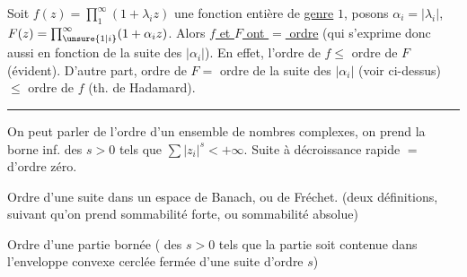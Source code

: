 Soit $f(z)=\prod_1^\infty(1+\lambda_iz)$ une fonction entière
de \uline{genre} $1$, posons $\alpha_i=|\lambda_i|$, $F(z)=\prod_{\unsure{1|i}}^\infty(1+\alpha_i z)$.
Alors \uline{$f$ et $F$ ont $=$ ordre} (qui s'exprime donc
aussi en fonction de la suite des $|\alpha_i|$). En effet,
l'ordre de $f\leq$ ordre de $F$ (évident). D'autre
part, ordre de $F=$ ordre de la suite des $|\alpha_i|$
(voir ci-dessus) $\leq$ ordre de $f$ (th. de Hadamard).
\begin{center}\rule{1.5cm}{0.4pt}\end{center}

On peut parler de l'ordre d'un ensemble  de
nombres complexes,  
on prend la borne inf. des $s>0$ tels que
$\sum|z_i|^s<+\infty$. Suite à décroissance rapide $=$
d'ordre zéro.

Ordre d'une suite dans un espace de Banach,
ou de Fréchet. (deux définitions, suivant qu'on
prend sommabilité forte, ou sommabilité absolue)

Ordre d'une partie bornée (  des
$s>0$ tels que la partie soit contenue dans l'enveloppe
convexe cerclée fermée d'une suite d'ordre $s$)
